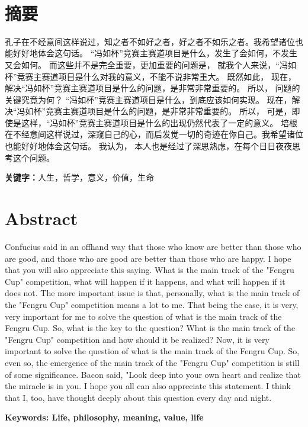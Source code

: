 \documentclass[zihao=-4]{ctexart}
\newcommand{\sanhao}{\fontsize{16pt}{0}}
\newcommand{\xiaosi}{\fontsize{12pt}{0}}
\begin{document}
\par \ 
\begin{center}
\sanhao
\centerline{\heiti{}}%
\end{center}



\renewcommand{\headrulewidth}{0pt}%
\clearpage
{} %

\xiaosi
\section*{摘要}
\begin{spacing}{1.5}
孔子在不经意间这样说过，知之者不如好之者，好之者不如乐之者。我希望诸位也能好好地体会这句话。 “冯如杯”竞赛主赛道项目是什么，发生了会如何，不发生又会如何。 而这些并不是完全重要，更加重要的问题是， 就我个人来说，“冯如杯”竞赛主赛道项目是什么对我的意义，不能不说非常重大。 既然如此， 现在，解决“冯如杯”竞赛主赛道项目是什么的问题，是非常非常重要的。 所以， 问题的关键究竟为何？ “冯如杯”竞赛主赛道项目是什么，到底应该如何实现。 现在，解决“冯如杯”竞赛主赛道项目是什么的问题，是非常非常重要的。 所以， 可是，即使是这样，“冯如杯”竞赛主赛道项目是什么的出现仍然代表了一定的意义。 培根在不经意间这样说过，深窥自己的心，而后发觉一切的奇迹在你自己。我希望诸位也能好好地体会这句话。 我认为， 本人也是经过了深思熟虑，在每个日日夜夜思考这个问题。
\end{spacing}
    
\textbf{关键字：}人生，哲学，意义，价值，生命

\newpage
\section*{Abstract}
\begin{spacing}{1.5}
\begin{adjustwidth}{0.42cm}{0.42cm}
\quad
Confucius said in an offhand way that those who know are better than those who are good, and those who are good are better than those who are happy. I hope that you will also appreciate this saying. What is the main track of the "Fengru Cup" competition, what will happen if it happens, and what will happen if it does not. The more important issue is that, personally, what is the main track of the "Fengru Cup" competition means a lot to me. That being the case, it is very, very important for me to solve the question of what is the main track of the Fengru Cup. So, what is the key to the question? What is the main track of the "Fengru Cup" competition and how should it be realized? Now, it is very important to solve the question of what is the main track of the Fengru Cup. So, even so, the emergence of the main track of the "Fengru Cup" competition is still of some significance. Bacon said, "Look deep into your own heart and realize that the miracle is in you. I hope you all can also appreciate this statement. I think that I, too, have thought deeply about this question every day and night.\par
\textbf{Keywords: Life, philosophy, meaning, value, life}
\end{adjustwidth}
\end{spacing}
\end{document}
